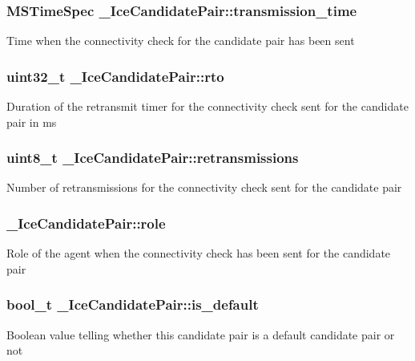 \subsubsection[{transmission\_\-time}]{\setlength{\rightskip}{0pt plus 5cm}MSTimeSpec {\bf \_\-IceCandidatePair::transmission\_\-time}}\label{struct__IceCandidatePair_a7d20e43f7f8338deecfde0508b11f5ec}
Time when the connectivity check for the candidate pair has been sent 
\subsubsection[{rto}]{\setlength{\rightskip}{0pt plus 5cm}uint32\_\-t {\bf \_\-IceCandidatePair::rto}}\label{struct__IceCandidatePair_a2f33ff606ddf4fa90eef726bc39bb3c2}
Duration of the retransmit timer for the connectivity check sent for the candidate pair in ms 
\subsubsection[{retransmissions}]{\setlength{\rightskip}{0pt plus 5cm}uint8\_\-t {\bf \_\-IceCandidatePair::retransmissions}}\label{struct__IceCandidatePair_aaac3713a3ae22f72ba8e282f60094a84}
Number of retransmissions for the connectivity check sent for the candidate pair 
\subsubsection[{role}]{ {\bf \_\-IceCandidatePair::role}}\label{struct__IceCandidatePair_a7a9c3e96efc6ea595f1b8f80896f4b20}
Role of the agent when the connectivity check has been sent for the candidate pair 
\subsubsection[{is\_\-default}]{\setlength{\rightskip}{0pt plus 5cm}bool\_\-t {\bf \_\-IceCandidatePair::is\_\-default}}\label{struct__IceCandidatePair_a8d0e670fbbd8faff39f147d37e03f7db}
Boolean value telling whether this candidate pair is a default candidate pair or not 
